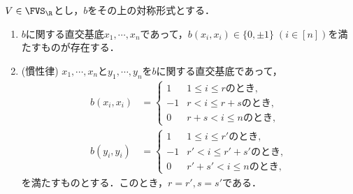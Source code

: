 \documentclass[uplatex, dvipdfmx]{jsreport}
\begin{document}
\begin{proposition}
    $V\in\FVS_\R$とし，$b$をその上の対称形式とする．
    \begin{enumerate}
        \item $b$に関する直交基底$x_1,\cdots,x_n$であって，$b(x_i,x_i)\in\{0,\pm 1\}\;(i\in[n])$を満たすものが存在する．
        \item (慣性律) $x_1,\cdots,x_n$と$y_1,\cdots,y_n$を$b$に関する直交基底であって，
        \begin{align*}
            b(x_i,x_i)&=\begin{cases}
                1&1\le i\le rのとき,\\
                -1&r<i\le r+sのとき,\\
                0&r+s<i\le nのとき,
            \end{cases}\\
            b(y_i,y_i)&=\begin{cases}
                1&1\le i\le r'のとき,\\
                -1&r'<i\le r'+s'のとき,\\
                0&r'+s'<i\le nのとき,
            \end{cases}
        \end{align*}
        を満たすものとする．このとき，$r=r',s=s'$である．
    \end{enumerate}
\end{proposition}
\end{document}
